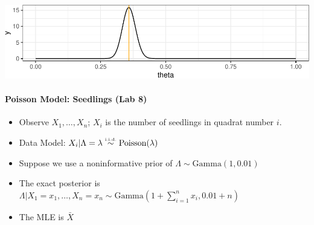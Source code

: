 \documentclass[]{article}
\newenvironment{Shaded}{\begin{snugshade}}{\end{snugshade}}
\newcommand{\KeywordTok}[1]{\textcolor[rgb]{0.13,0.29,0.53}{\textbf{#1}}}
\newcommand{\DataTypeTok}[1]{\textcolor[rgb]{0.13,0.29,0.53}{#1}}
\newcommand{\DecValTok}[1]{\textcolor[rgb]{0.00,0.00,0.81}{#1}}
\newcommand{\FloatTok}[1]{\textcolor[rgb]{0.00,0.00,0.81}{#1}}
\newcommand{\StringTok}[1]{\textcolor[rgb]{0.31,0.60,0.02}{#1}}
\newcommand{\OperatorTok}[1]{\textcolor[rgb]{0.81,0.36,0.00}{\textbf{#1}}}
\newcommand{\NormalTok}[1]{#1}
\providecommand{\tightlist}{%
  \setlength{\itemsep}{0pt}\setlength{\parskip}{0pt}}
\let\oldparagraph\paragraph
\renewcommand{\paragraph}[1]{\oldparagraph{#1}\mbox{}}
\begin{document}
\includegraphics{20190306_normal_approx_posterior_files/figure-latex/unnamed-chunk-3-1.pdf}

\paragraph{Poisson Model: Seedlings (Lab
8)}\label{poisson-model-seedlings-lab-8}

\begin{itemize}
\tightlist
\item
  Observe \(X_1, \ldots, X_n\); \(X_i\) is the number of seedlings in
  quadrat number \(i\).
\item
  Data Model:
  \(X_i | \Lambda = \lambda \stackrel{{\mbox{\text{\tiny i.i.d.}}}}{\sim} \text{Poisson}(\lambda)\)
\item
  Suppose we use a noninformative prior of
  \(\Lambda \sim \text{Gamma}(1, 0.01)\)
\item
  The exact posterior is
  \(\Lambda | X_1 = x_1, \ldots, X_n = x_n \sim \text{Gamma}(1 + \sum_{i = 1}^{n} x_i, 0.01 + n)\)
\item
  The MLE is \(\bar{X}\)
\end{itemize}

\begin{Shaded}
\end{Shaded}
\end{document}

